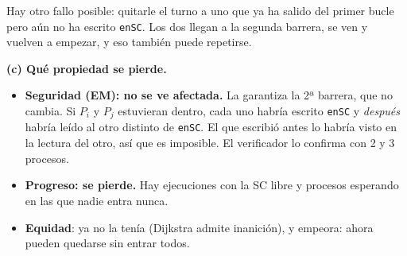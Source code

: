 \begin{solucion}
Hay otro fallo posible: quitarle el turno a uno que ya ha salido del primer bucle pero aún no ha escrito
\texttt{enSC}. Los dos llegan a la segunda barrera, se ven y vuelven a empezar, y eso también puede repetirse.

\textbf{(c) Qué propiedad se pierde.}
\begin{itemize}[leftmargin=*]
  \item \textbf{Seguridad (EM): no se ve afectada.} La garantiza la 2ª barrera, que no cambia. Si $P_i$ y $P_j$
        estuvieran dentro, cada uno habría escrito \texttt{enSC} y \emph{después} habría leído al otro distinto de
        \texttt{enSC}. El que escribió antes lo habría visto en la lectura del otro, así que es imposible. El
        verificador lo confirma con 2 y 3 procesos.
  \item \textbf{Progreso: se pierde.} Hay ejecuciones con la SC libre y procesos esperando en las que nadie entra
        nunca.
  \item \textbf{Equidad}: ya no la tenía (Dijkstra admite inanición), y empeora: ahora pueden quedarse sin entrar
        todos.
\end{itemize}
\end{solucion}
